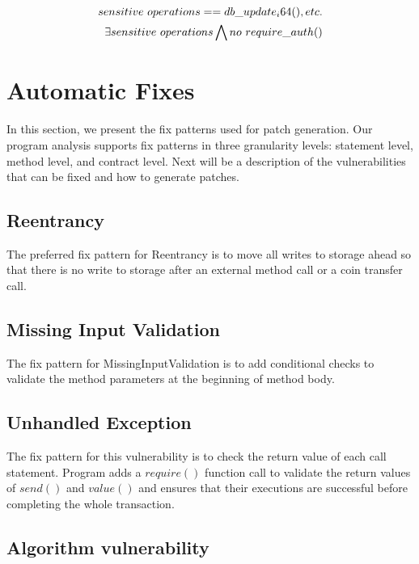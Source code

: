 \documentclass[a4paper, 10pt, conference, twocolumn]{ieeeconf}       %
\begin{document}
\begin{equation}
\begin{aligned}
sensitive~operations == db\_update_i64(\*), etc. \\
\exists sensitive~operations \bigwedge no~require\_auth(\*)
\end{aligned}
\end{equation}

\section{Automatic Fixes}

In this section, we present the fix patterns used for patch generation.
Our program analysis supports fix patterns in three granularity levels: statement level, method level, and contract level.
Next will be a description of the vulnerabilities that can be fixed and how to generate patches.

\subsection{Reentrancy}

The preferred fix pattern for Reentrancy is to move all writes to storage ahead so that there is no write to storage after an external method call or a coin transfer call.

\subsection{Missing Input Validation}

The fix pattern for MissingInputValidation is to add conditional checks to validate the method parameters at the beginning of method body.

\subsection{Unhandled Exception}

The fix pattern for this vulnerability is to check the return value of each call statement.
Program adds a $require()$ function call to validate the return values of $send()$ and $value()$ and ensures that their executions are successful before completing the whole transaction.

\subsection{Algorithm vulnerability}
\end{document}

